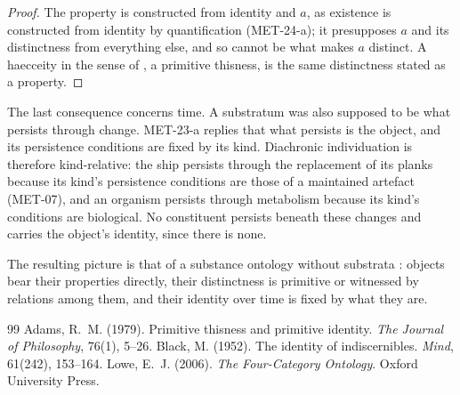\documentclass{situationist-preprint}
\begin{document}
\begin{proof}
The property is constructed from identity and $a$, as existence is constructed from identity by quantification (MET-24-a); it presupposes $a$ and its distinctness from everything else, and so cannot be what makes $a$ distinct. A haecceity in the sense of \citet{Adams1979}, a primitive thisness, is the same distinctness stated as a property.
\end{proof}

The last consequence concerns time. A substratum was also supposed to be what persists through change. MET-23-a replies that what persists is the object, and its persistence conditions are fixed by its kind. Diachronic individuation is therefore kind-relative: the ship persists through the replacement of its planks because its kind's persistence conditions are those of a maintained artefact (MET-07), and an organism persists through metabolism because its kind's conditions are biological. No constituent persists beneath these changes and carries the object's identity, since there is none.

The resulting picture is that of a substance ontology without substrata \citep{Lowe2006}: objects bear their properties directly, their distinctness is primitive or witnessed by relations among them, and their identity over time is fixed by what they are.

\begin{thebibliography}{99}\small
{} Adams, R.~M. (1979). Primitive thisness and primitive identity. \emph{The Journal of Philosophy}, 76(1), 5--26.
 Black, M. (1952). The identity of indiscernibles. \emph{Mind}, 61(242), 153--164.
 Lowe, E.~J. (2006). \emph{The Four-Category Ontology}. Oxford University Press.
\end{thebibliography}
\end{document}

